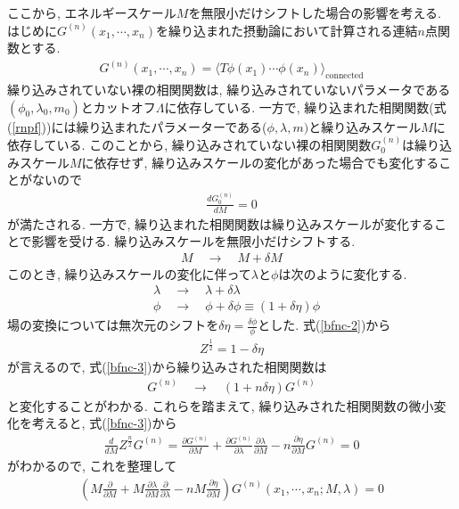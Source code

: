 ここから, エネルギースケール$M$を無限小だけシフトした場合の影響を考える.
はじめに$G^{(n)}(x_1,\cdots,x_n)$を繰り込まれた摂動論において計算される連結$n$点関数とする.
\begin{align}
  G^{(n)}(x_1,\cdots,x_n) = \langle T\phi(x_1)\cdots\phi(x_n) \rangle_{\text{connected}}\label{rnpf}
\end{align}
繰り込みされていない裸の相関関数は, 繰り込みされていないパラメータである$(\phi_0,\lambda_0,m_0)$とカットオフ$\Lambda$に依存している.
一方で, 繰り込まれた相関関数(式(\ref{rnpf}))には繰り込まれたパラメーターである($\phi,\lambda,m)$と繰り込みスケール$M$に依存している.
このことから, 繰り込みされていない裸の相関関数$G^{(n)}_0$は繰り込みスケール$M$に依存せず, 繰り込みスケールの変化があった場合でも変化することがないので
\begin{align}
  \frac{d G_0^{(n)}}{dM} = 0 \label{bfnc-3}
\end{align}
が満たされる.
一方で, 繰り込まれた相関関数は繰り込みスケールが変化することで影響を受ける.
繰り込みスケールを無限小だけシフトする.
\begin{align}
  M\quad\rightarrow\quad M + \delta M \label{sftM}
\end{align}
このとき, 繰り込みスケールの変化に伴って$\lambda$と$\phi$は次のように変化する.
\begin{align}
  &\lambda \quad\rightarrow\quad \lambda + \delta \lambda \label{sftl}\\
  &\phi \quad\rightarrow\quad \phi+ \delta\phi \equiv (1+\delta\eta)\phi \label{sftp}
\end{align}
場の変換については無次元のシフトを$\delta \eta  = \frac{\delta\phi}{\phi}$とした.
式(\ref{bfnc-2})から
\begin{align}
  Z^{\frac{1}{2}} = 1 - \delta\eta\label{bfnc-4}
\end{align}
が言えるので, 式(\ref{bfnc-3})から繰り込みされた相関関数は
\begin{align}
  G^{(n)}\quad\rightarrow\quad(1+n\delta\eta)G^{(n)}\label{sftg}
\end{align}
と変化することがわかる.
これらを踏まえて, 繰り込みされた相関関数の微小変化を考えると, 式(\ref{bfnc-3})から
\begin{align}
  \frac{d}{dM} Z^{\frac{n}{2}}G^{(n)} = \frac{\partial G^{(n)}}{\partial M} + \frac{\partial G^{(n)}}{\partial \lambda}\frac{\partial \lambda}{\partial M} - n \frac{\partial \eta}{\partial M}G^{(n)} = 0
\end{align}
がわかるので, これを整理して
\begin{align}
  \left(M \frac{\partial}{\partial M} + M\frac{\partial \lambda}{\partial M} \frac{\partial}{\partial \lambda} -nM\frac{\partial \eta}{\partial M}\right)G^{(n)}(x_1,\cdots,x_n;M,\lambda) = 0\label{CS-1}
\end{align}
